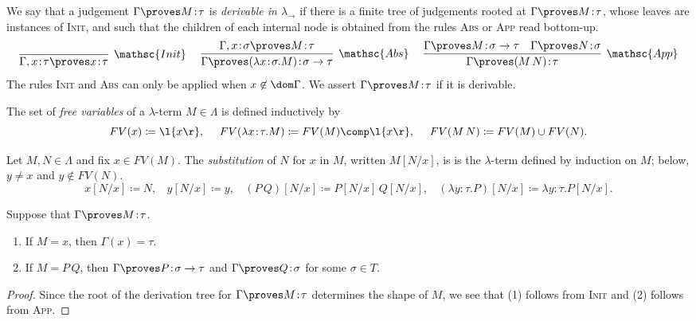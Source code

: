 \documentclass[reqno]{amsart}
\begin{document}
    \begin{definition}
        We say that a judgement $\Gamma\proves M\!:\!\tau$ is \textit{derivable in $\lambda_\rightarrow$} if there is a finite tree of judgements rooted at $\Gamma\proves M\!:\!\tau$, whose leaves are instances of \textsc{Init}, and such that the children of each internal node is obtained from the rules \textsc{Abs} or \textsc{App} read bottom-up.
        \begin{equation*}
            \infer[\mathsc{Init}]{\Gamma,x\!:\!\tau\proves x\!:\!\tau}{}\ \ \ \ 
            \infer[\mathsc{Abs}]{\Gamma\proves(\lambda x\!:\!\sigma.M)\!:\!\sigma\rightarrow\tau}{\Gamma,x\!:\!\sigma\proves M\!:\!\tau}\ \ \ \ 
            \infer[\mathsc{App}]{\Gamma\proves(M\,N)\!:\!\tau}{
                \Gamma\proves M\!:\!\sigma\rightarrow\tau &
                \Gamma\proves N\!:\!\sigma
            }
        \end{equation*}
        The rules \textsc{Init} and \textsc{Abs} can only be applied when $x\not\in\dom\Gamma$. We assert $\Gamma\proves M\!:\!\tau$ if it is derivable.
    \end{definition}

    \begin{definition}
        The set of \textit{free variables} of a $\lambda$-term $M\in\Lambda$ is defined inductively by
        \begin{equation*}
            FV(x)\coloneqq\l\{x\r\},\ \ \ \ FV(\lambda x\!:\!\tau.M)\coloneqq FV(M)\comp\l\{x\r\},\ \ \ \ FV(M\,N)\coloneqq FV(M)\cup FV(N).
        \end{equation*}
    \end{definition}

    \begin{definition}
        Let $M,N\in\Lambda$ and fix $x\in FV(M)$. The \textit{substitution} of $N$ for $x$ in $M$, written $M[N/x]$, is is the $\lambda$-term defined by induction on $M$; below, $y\neq x$ and $y\not\in FV(N)$.
        \begin{equation*}
            x[N/x]\coloneqq N,\ \ \ \ y[N/x]\coloneqq y,\ \ \ \ (P\,Q)[N/x]\coloneqq P[N/x]\,Q[N/x],\ \ \ \ (\lambda y\!:\!\tau.P)[N/x]\coloneqq\lambda y\!:\!\tau.P[N/x].
        \end{equation*}
    \end{definition}

    \begin{lemma}\label{lem:simply_typed_generation_1}
        Suppose that $\Gamma\proves M\!:\!\tau$.
        \begin{enumerate}
            \item If $M=x$, then $\Gamma(x)=\tau$.
            \item If $M=P\,Q$, then $\Gamma\proves P\!:\!\sigma\rightarrow\tau$ and $\Gamma\proves Q\!:\!\sigma$ for some $\sigma\in T$.
        \end{enumerate}
    \end{lemma}
    \begin{proof}
        Since the root of the derivation tree for $\Gamma\proves M\!:\!\tau$ determines the shape of $M$, we see that (1) follows from \textsc{Init} and (2) follows from \textsc{App}.
    \end{proof}
\end{document}
